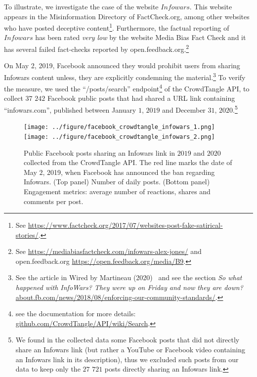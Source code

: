 \documentclass{article}
\begin{document}
\smallskip

To illustrate, we investigate the case of the website $Infowars$. This website appears in the Misinformation Directory of FactCheck.org, among other websites who have posted deceptive content\footnote{See \href{https://www.factcheck.org/2017/07/websites-post-fake-satirical-stories/}{https://www.factcheck.org/2017/07/websites-post-fake-satirical-stories/}.}. Furthermore, the factual reporting of $Infowars$ has been rated {\it very low} by the website Media Bias Fact Check and it has several failed fact-checks reported by open.feedback.org.\footnote{See \href{https://mediabiasfactcheck.com/infowars-alex-jones/}{https://mediabiasfactcheck.com/infowars-alex-jones/} and open.feedback.org \href{https://open.feedback.org/media/B9}{https://open.feedback.org/media/B9}.} 

On May 2, 2019, Facebook announced they would prohibit users from sharing Infowars content unless, they are explicitly condemning the material.\footnote{See the article in Wired by Martineau (2020)~\cite{wiredalexjones} and see the section {\it So what happened with InfoWars? They were up on Friday and now they are down?} \href{https://about.fb.com/news/2018/08/enforcing-our-community-standards/}{about.fb.com/news/2018/08/enforcing-our-community-standards/}.} To verify the measure, we used the ``/posts/search'' endpoint\footnote{see the documentation for more details: \href{https://github.com/CrowdTangle/API/wiki/Search}{github.com/CrowdTangle/API/wiki/Search}.} of the CrowdTangle API, to collect $37$ $242$ Facebook public posts that had shared a URL link containing ``infowars.com'', published between January $1$, $2019$ and December $31$, $2020$.\footnote{We found in the collected data some Facebook posts that did not directly share an Infowars link (but rather a YouTube or Facebook video containing an Infowars link in its description), thus we excluded such posts from our data to keep only the $27$ $721$ posts directly sharing an Infowars link.} 

\begin{figure}[h]
\hspace{-2em}
		\texttt{[image: ../figure/facebook\_crowdtangle\_infowars\_1.png]}
		\texttt{[image: ../figure/facebook\_crowdtangle\_infowars\_2.png]} 
	\caption{Public Facebook posts sharing an Infowars link in $2019$ and $2020$ collected from the CrowdTangle API. The red line marks the date of May $2$, 2019, when Facebook has announced the ban regarding Infowars. (Top panel) Number of daily posts. (Bottom panel) Engagement metrics: average number of reactions, shares and comments per post. }
	\label{infowars1}
\end{figure}
\end{document}
